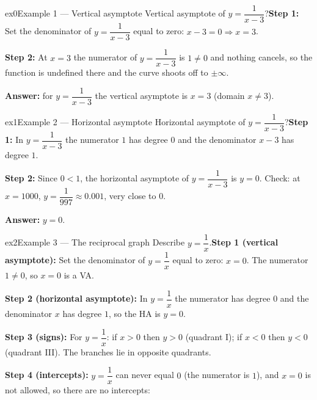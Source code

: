 \documentclass[11pt]{article}
\begin{document}

\begin{example}{ex0}{Example 1 --- Vertical asymptote}
Vertical asymptote of $y=\dfrac{1}{x-3}$?\soln \textbf{Step 1:} Set the denominator of $y=\dfrac{1}{x-3}$ equal to zero: $x-3=0\Rightarrow x=3$.

\textbf{Step 2:} At $x=3$ the numerator of $y=\dfrac{1}{x-3}$ is $1\ne0$ and nothing cancels, so the function is undefined there and the curve shoots off to $\pm\infty$.

\textbf{Answer:} for $y=\dfrac{1}{x-3}$ the vertical asymptote is $x=3$ (domain $x\ne3$).
\end{example}

\begin{example}{ex1}{Example 2 --- Horizontal asymptote}
Horizontal asymptote of $y=\dfrac{1}{x-3}$?\soln \textbf{Step 1:} In $y=\dfrac{1}{x-3}$ the numerator $1$ has degree $0$ and the denominator $x-3$ has degree $1$.

\textbf{Step 2:} Since $0<1$, the horizontal asymptote of $y=\dfrac{1}{x-3}$ is $y=0$. Check: at $x=1000$, $y=\dfrac{1}{997}\approx0.001$, very close to $0$.

\textbf{Answer:} $y=0$.
\end{example}

\begin{example}{ex2}{Example 3 --- The reciprocal graph}
Describe $y=\dfrac1x$.\soln \textbf{Step 1 (vertical asymptote):} Set the denominator of $y=\dfrac1x$ equal to zero: $x=0$. The numerator $1\ne0$, so $x=0$ is a VA.

\textbf{Step 2 (horizontal asymptote):} In $y=\dfrac1x$ the numerator has degree $0$ and the denominator $x$ has degree $1$, so the HA is $y=0$.

\textbf{Step 3 (signs):} For $y=\dfrac1x$: if $x>0$ then $y>0$ (quadrant I); if $x<0$ then $y<0$ (quadrant III). The branches lie in opposite quadrants.

\textbf{Step 4 (intercepts):} $y=\dfrac1x$ can never equal $0$ (the numerator is $1$), and $x=0$ is not allowed, so there are no intercepts:\begin{center}\end{center}
\end{example}
\end{document}
